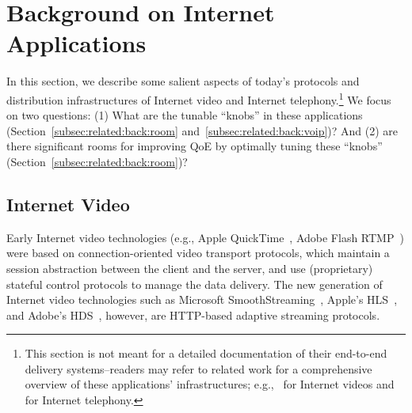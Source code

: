 \section{Background on Internet Applications}
\label{sec:related:back}


In this section, we describe some salient aspects of today's  protocols 
and distribution infrastructures of Internet video and 
Internet telephony.\footnote{This section is not meant for a detailed documentation of 
their end-to-end delivery systems--readers may refer to 
related work for a comprehensive 
overview of these applications' infrastructures; 
e.g.,~\cite{seufert2015survey}
for Internet videos and~\cite{baset2004analysis} for Internet telephony.} 
We focus on two questions:
(1) What are the tunable ``knobs'' in these applications
(Section~\ref{subsec:related:back:room} and~\ref{subsec:related:back:voip})? 
And (2) are there
significant rooms for improving QoE by optimally tuning these ``knobs''
(Section~\ref{subsec:related:back:room})? 

\subsection{Internet Video}
\label{subsec:related:back:video}

Early Internet video technologies (e.g.,  Apple QuickTime~\cite{quicktime}, Adobe Flash
RTMP~\cite{rtmp}) were  based on connection-oriented video transport protocols, 
which maintain a session  abstraction between the client and the server, 
and use (proprietary) stateful control protocols to manage the data delivery.  
The new generation of Internet video technologies such as Microsoft
SmoothStreaming~\cite{SmoothStreaming}, Apple's HLS~\cite{hls}, and Adobe's
HDS~\cite{HDS}, however, are HTTP-based adaptive streaming protocols.

